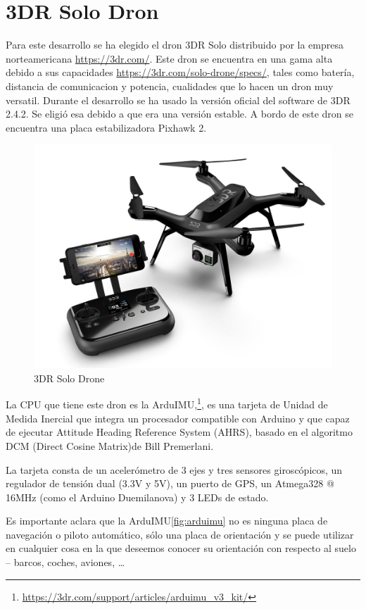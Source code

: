 \section{3DR Solo Dron}
Para este desarrollo se ha elegido el dron 3DR\cite{3dr} Solo distribuido por la empresa norteamericana \url{https://3dr.com/}. Este dron se encuentra en una gama alta debido a sus capacidades \url{https://3dr.com/solo-drone/specs/}, tales como batería, distancia de comunicacion y potencia, cualidades que lo hacen un dron muy versatil. Durante el desarrollo se ha usado la versión oficial del software de 3DR 2.4.2. Se eligió esa debido a que era una versión estable. A bordo de este dron se encuentra una placa estabilizadora Pixhawk 2.

\begin{figure}[H]
  \centering
  \includegraphics[scale=1]{imagenes/3drSoloDron.jpg}
  \caption{3DR Solo Drone}
  \label{fig:3drsolodrone}
\end{figure}

La CPU que tiene este dron es la ArduIMU,\footnote{\url{https://3dr.com/support/articles/arduimu_v3_kit/}}, es una tarjeta de Unidad de Medida Inercial que integra un procesador compatible con Arduino y que capaz de ejecutar Attitude Heading Reference System (AHRS), basado en el algoritmo DCM (Direct Cosine Matrix)de Bill Premerlani.

La tarjeta consta de un acelerómetro de 3 ejes y tres sensores giroscópicos, un regulador de tensión dual (3.3V y 5V), un puerto de GPS, un Atmega328 @ 16MHz (como el Arduino Duemilanova) y 3 LEDs de estado.

Es importante aclara que la ArduIMU\ref{fig:arduimu} no es ninguna placa de navegación o piloto automático, sólo una placa de orientación y se puede utilizar en cualquier cosa en la que deseemos conocer su orientación con respecto al suelo – barcos, coches, aviones, …

